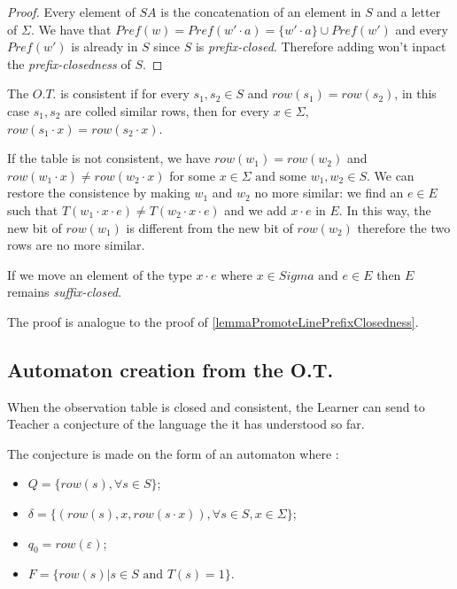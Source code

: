 \begin{proof}
  Every element of $SA$ is the concatenation of an element in $S$ and a letter of $\Sigma$. We have that $Pref(w) = Pref(w' \cdot a) = \{w' \cdot a\} \cup Pref(w')$ and every $Pref(w')$ is already in $S$ since $S$ is \textit{prefix-closed}. Therefore adding \word{} won't inpact the \textit{prefix-closedness} of $S$.
\end{proof}

\begin{definition}[Consistence]
  The $O.T.$ is consistent if for every $s_1,s_2 \in S$ and $row(s_1) = row(s_2)$, in this case $s_1,s_2$ are colled similar rows, then for every $x \in \Sigma$, $row(s_1 \cdot x) = row(s_2 \cdot x)$.
\end{definition}

If the table is not consistent, we have $row(w_1) = row(w_2)$ and $row(w_1 \cdot x) \neq row(w_2 \cdot x)$ for some $x \in \Sigma \text{ and some }w_1, w_2 \in S$. We can restore the consistence by making $w_1$ and $w_2$ no more similar: we find an $e \in E$ such that $T(w_1 \cdot x \cdot e) \neq T(w_2 \cdot x \cdot e)$ and we add $x \cdot e$ in $E$. In this way, the new bit of $row(w_1)$ is different from the new bit of $row(w_2)$ therefore the two rows are no more similar.

\begin{lemma}
  If we move an element of the type $x \cdot e$ where $x \in Sigma \text{ and } e \in E$ then $E$ remains \textit{suffix-closed}.
\end{lemma}

The proof is analogue to the proof of \cref{lemmaPromoteLinePrefixClosedness}.

\subsection{Automaton creation from the O.T.}

When the observation table is closed and consistent, the Learner can send to Teacher a conjecture of the language the it has understood so far.

The conjecture is made on the form of an automaton where :
\begin{itemize}
  \item $Q = \{row(s), \forall s \in S\}$;
  \item $\delta = \{(row(s), x, row(s \cdot x)), \forall s \in S, x \in \Sigma\}$;
  \item $q_0 = row(\varepsilon)$;
  \item $F = \{row(s) | s \in S \text{ and } T(s) = 1 \}$.
\end{itemize}

